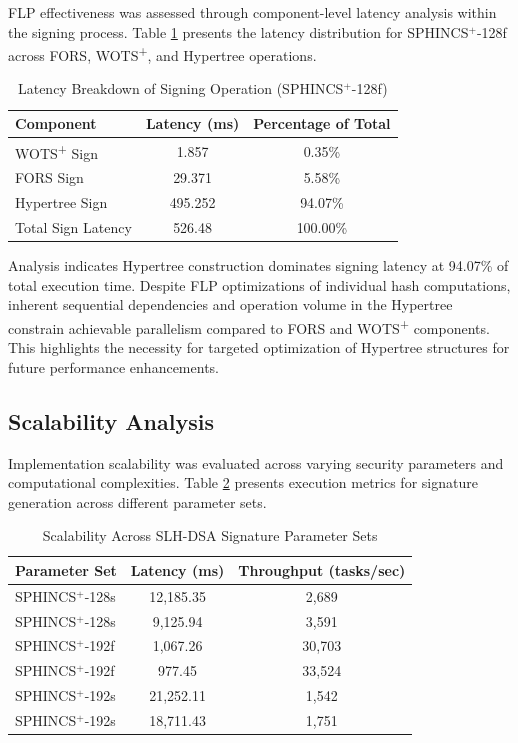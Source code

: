 \documentclass[journal]{IEEEtran}
\begin{document}
FLP effectiveness was assessed through component-level latency analysis within the signing process. Table \ref{tab:flp_impact} presents the latency distribution for SPHINCS$^+$-128f across FORS, WOTS\textsuperscript{+}, and Hypertree operations.

\begin{table}[h]
  \centering
  \caption{Latency Breakdown of Signing Operation (SPHINCS$^+$-128f)}
  \label{tab:flp_impact}
  \begin{tabular}{@{}lcc@{}}
    \toprule
    \textbf{Component} & \textbf{Latency (ms)} & \textbf{Percentage of Total} \\
    \midrule
    WOTS\textsuperscript{+} Sign & 1.857 & 0.35\% \\
    FORS Sign & 29.371 & 5.58\% \\
    Hypertree Sign & 495.252 & 94.07\% \\
    \midrule
    Total Sign Latency & 526.48 & 100.00\% \\
    \bottomrule
  \end{tabular}
\end{table}

Analysis indicates Hypertree construction dominates signing latency at 94.07\% of total execution time. Despite FLP optimizations of individual hash computations, inherent sequential dependencies and operation volume in the Hypertree constrain achievable parallelism compared to FORS and WOTS\textsuperscript{+} components. This highlights the necessity for targeted optimization of Hypertree structures for future performance enhancements.
\subsection{Scalability Analysis}

Implementation scalability was evaluated across varying security parameters and computational complexities. Table \ref{tab:scalability} presents execution metrics for signature generation across different parameter sets.

\begin{table}[h]
  \centering
  \caption{Scalability Across SLH-DSA Signature Parameter Sets}
  \label{tab:scalability}
  \begin{tabular}{@{}lcc@{}}
    \toprule
    \textbf{Parameter Set} & \textbf{Latency (ms)} & \textbf{Throughput (tasks/sec)} \\
    \midrule
    SPHINCS$^+$-128s \cite{Wang2025} & 12,185.35 & 2,689 \\
    SPHINCS$^+$-128s & 9,125.94 & 3,591 \\
    \midrule
    SPHINCS$^+$-192f \cite{Wang2025} & 1,067.26 & 30,703 \\
    SPHINCS$^+$-192f & 977.45 & 33,524 \\
    \midrule
    SPHINCS$^+$-192s \cite{Wang2025} & 21,252.11 & 1,542 \\
    SPHINCS$^+$-192s & 18,711.43 & 1,751 \\
    \bottomrule
  \end{tabular}
\end{table}
\end{document}
